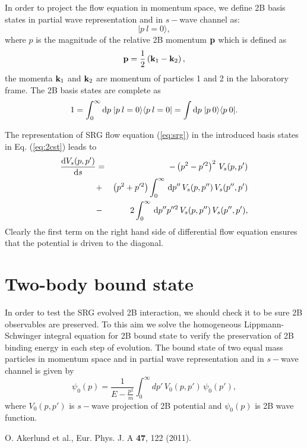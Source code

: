 \documentclass[aps,prc,preprint,groupedaddress]{revtex4-1}
\newcommand{\rd}{\ensuremath{\hbox{d}}}
\newcommand{\id}{\ensuremath{\,\rd}}
\begin{document}
In order to project the flow equation in momentum space, we define 2B basis states in partial wave representation and in $s-$wave channel as:
\begin{equation}
  \label{eq:2cst}
  |p \:l=0\rangle,
\end{equation}
where $p$ is the magnitude of the relative 2B momentum ${\bf p}$ which is defined as
\begin{equation}
  \label{eq:jacobi}
  {\bf p}=\frac{1}{2}\left({\bf k}_1-{\bf k}_2\right),
\end{equation}
the momenta ${\bf k}_1$ and ${\bf k}_2$ are momentum of particles 1 and 2 in the laboratory frame.  The 2B basis states are complete as
\begin{equation}
  \label{eq:completness}
  1=\int_0^\infty \hbox{d}p\;|p \:l=0\rangle\langle p \: l=0|=\int \hbox{d}p\;|p\:
  0\rangle\langle p\: 0| .
\end{equation}


The representation of SRG flow equation (\ref{eq:srg}) in the introduced basis states in Eq. (\ref{eq:2cst}) leads to
\begin{eqnarray}
\label{eq:two_body_momspace}
\nonumber
\frac{\rd V_s(p,p')}{\rd s} &=& -\left( p^2-p'^2 \right )^2\, V_s(p,p') \\ 
\nonumber
&+& \left ( p^2+p'^2 \right )\int_{0}^{\infty} \id p'' \,  V_s(p,p'') \, V_s(p'',p') \\
&-&2\int_{0}^{\infty} \id p'' p''^2 \,  V_s(p,p'') \, V_s(p'',p') ,
\end{eqnarray}
Clearly the first term on the right hand side of differential flow equation ensures that the potential is
driven to the diagonal.


\section{Two-body bound state}

In order to test the SRG evolved 2B interaction, we should check it to be sure 2B observables are preserved. To this aim we solve the homogeneous Lippmann-Schwinger integral equation for 2B bound state to verify the preservation of 2B binding energy in each step of evolution.
The bound state of two equal mass particles in momentum space and in partial wave representation and in $s-$wave channel is given by
\begin{equation}
\psi_0(p) = \frac{1}{E-\frac{p^2}{m}} \int_{0}^{\infty} dp' \, V_0(p,p') \, \psi_0(p'),
\end{equation}
where $V_0(p,p')$ is $s-$wave projection of 2B potential and $\psi_0(p)$ is 2B wave function.












%
%


\begin{thebibliography}{9}

O. Akerlund et al., Eur. Phys. J. A {\bf 47}, 122 (2011).



\end{thebibliography}

 
\end{document}
